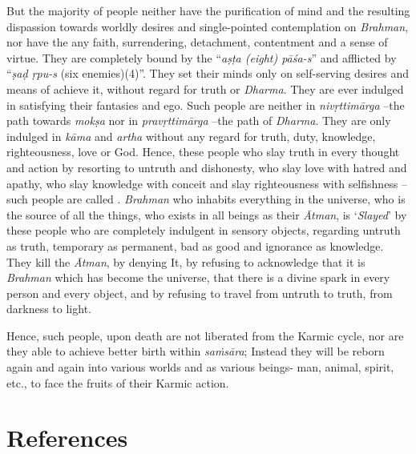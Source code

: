 But the majority of people neither have the purification of mind and the resulting dispassion towards worldly desires and single-pointed contemplation on \emph{Brahman}, nor have the any faith, surrendering, detachment, contentment and a sense of virtue. They are completely bound by the ``\emph{aṣṭa (eight) pāśa-s}'' and afflicted by ``\emph{ṣaḍ ṛpu-s} (six enemies)(4)''. They set their minds only on self-serving desires and means of achieve it, without regard for truth or \emph{Dharma}. They are ever indulged in satisfying their fantasies and ego. Such people are neither in \emph{nivṛttimārga} --the path towards \emph{mokṣa} nor in \emph{pravṛttimārga} --the path of \emph{Dharma}. They are only indulged in \emph{kāma} and \emph{artha} without any regard for truth, duty, knowledge, righteousness, love or God. Hence, these people who slay truth in every thought and action by resorting to untruth and dishonesty, who slay love with hatred and apathy, who slay knowledge with conceit and slay righteousness with selfishness --such people are called . \emph{Brahman} who inhabits everything in the universe, who is the source of all the things, who exists in all beings as their \emph{Ātman}, is `\emph{Slayed}' by these people who are completely indulgent in sensory objects, regarding untruth as truth, temporary as permanent, bad as good and ignorance as knowledge. They kill the \emph{Ātman}, by denying It, by refusing to acknowledge that it is \emph{Brahman} which has become the universe, that there is a divine spark in every person and every object, and by refusing to travel from untruth to truth, from darkness to light.

Hence, such people, upon death are not liberated from the Karmic cycle, nor are they able to achieve better birth within \emph{saṁsāra}; Instead they will be reborn again and again into various worlds and as various beings- man, animal, spirit, etc., to face the fruits of their Karmic action.

\section*{References}

